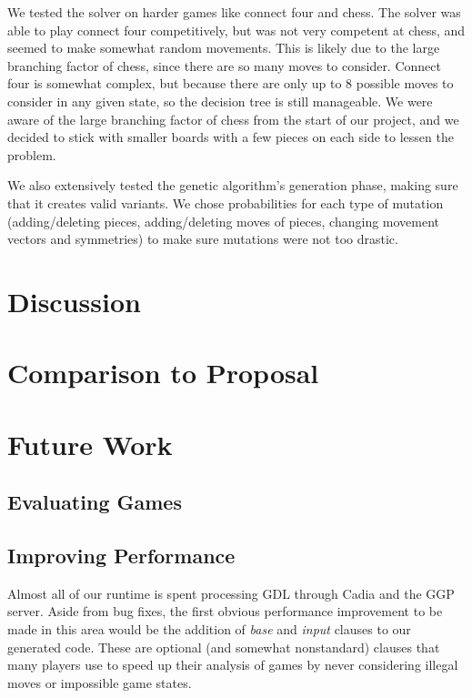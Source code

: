 \documentclass[11pt,letterpaper]{article}
\begin{document}
We tested the solver on harder games like connect four and chess. The solver was able to play connect four competitively, but was not very competent at chess, and seemed to make somewhat random movements. This is likely due to the large branching factor of chess, since there are so many moves to consider. Connect four is somewhat complex, but because there are only up to 8 possible moves to consider in any given state, so the decision tree is still manageable. We were aware of the large branching factor of chess from the start of our project, and we decided to stick with smaller boards with a few pieces on each side to lessen the problem.

We also extensively tested the genetic algorithm's generation phase, making sure that it creates valid variants. We chose probabilities for each type of mutation (adding/deleting pieces, adding/deleting moves of pieces, changing movement vectors and symmetries) to make sure mutations were not too drastic.

\section{Discussion}


\section{Comparison to Proposal}


\section{Future Work}

\subsection{Evaluating Games}

\subsection{Improving Performance}

Almost all of our runtime is spent processing GDL through Cadia and the GGP
server. Aside from bug fixes, the first obvious performance improvement to be
made in this area would be the addition of \textit{base} and \textit{input}
clauses to our generated code. These are optional (and somewhat nonstandard)
clauses that many players use to speed up their analysis of games by never
considering illegal moves or impossible game states.
\end{document}
